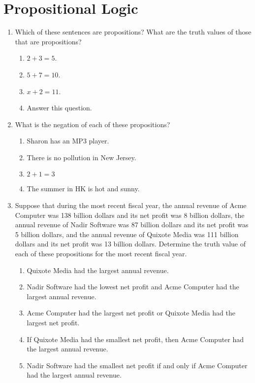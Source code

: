 \documentclass{../../cls/sig-alternate-05-2015}
\begin{document}
\section{Propositional Logic}
\begin{enumerate}
\item Which of these sentences are propositions? What are the
truth values of those that are propositions?
\begin{enumerate}
	\item $2 + 3 = 5$.
	\item $5 + 7 = 10$.
	\item $x + 2 = 11$.
	\item Answer this question.
\end{enumerate}

\item What is the negation of each of these propositions?
\begin{enumerate}
	\item Sharon has an MP3 player.
	\item There is no pollution in New Jersey.
	\item $2 + 1 = 3$
	\item The summer in HK is hot and sunny.
\end{enumerate}

\item Suppose that during the most recent fiscal year, the annual
revenue of Acme Computer was 138 billion dollars
and its net profit was 8 billion dollars, the annual revenue
of Nadir Software was 87 billion dollars and its net profit
was 5 billion dollars, and the annual revenue of Quixote
Media was 111 billion dollars and its net profit was
13 billion dollars. Determine the truth value of each of
these propositions for the most recent fiscal year.
\begin{enumerate}
	\item Quixote Media had the largest annual revenue.
	\item Nadir Software had the lowest net profit and Acme
	Computer had the largest annual revenue.
	\item Acme Computer had the largest net profit or Quixote
	Media had the largest net profit.
	\item If Quixote Media had the smallest net profit, then
	Acme Computer had the largest annual revenue.
	\item Nadir Software had the smallest net profit if and only
	if Acme Computer had the largest annual revenue.
\end{enumerate}


\end{enumerate}
\end{document}
